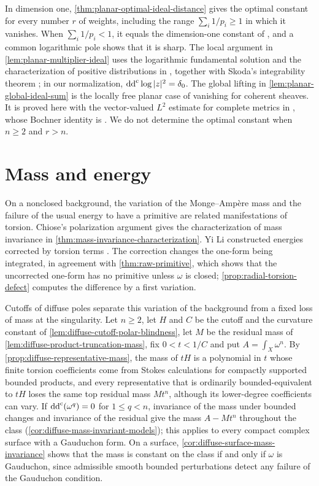 In dimension one, \cref{thm:planar-optimal-ideal-distance} gives the optimal constant for every number $r$ of weights, including the range $\sum_i1/p_i\geq1$ in which it vanishes. When $\sum_i1/p_i<1$, it equals the dimension-one constant of \cite[v1, Theorem~1.2, pp.~1--2]{TakDivision26}, and a common logarithmic pole shows that it is sharp. The local argument in \cref{lem:planar-multiplier-ideal} uses the logarithmic fundamental solution and the characterization of positive distributions in \cite[Chapter~I, Sections~4.A--4.C, pp.~30--36]{DemCADG}, together with Skoda's integrability theorem \cite[Lemma~5.6]{DemAM11}; in our normalization, $\mathrm{dd}^{\mathrm{c}}\log|z|^2=\delta_0$. The global lifting in \cref{lem:planar-global-ideal-sum} is the locally free planar case of vanishing for coherent sheaves. It is proved here with the vector-valued $L^2$ estimate for complete metrics in \cite[Theorem~5.1 and its proof, pp.~33--34]{DemAM11}, whose Bochner identity is \cite[Section~4.C, p.~30]{DemAM11}. We do not determine the optimal constant when $n\geq2$ and $r>n$.

\section{Mass and energy}
\label{sec:history-mass-energy}

On a nonclosed background, the variation of the Monge--Amp\`ere mass and the failure of the usual energy to have a primitive are related manifestations of torsion. Chiose's polarization argument \cite[Theorems~1--2, pp.~576--577]{Chiose16} gives the characterization of mass invariance in \cref{thm:mass-invariance-characterization}. Yi Li constructed energies corrected by torsion terms \cite[v1, Equation~(1.18) and Theorem~1.2, p.~5]{YiLi10}. The correction changes the one-form being integrated, in agreement with \cref{thm:raw-primitive}, which shows that the uncorrected one-form has no primitive unless $\omega$ is closed; \cref{prop:radial-torsion-defect} computes the difference by a first variation.

Cutoffs of diffuse poles separate this variation of the background from a fixed loss of mass at the singularity. Let $n\geq2$, let $H$ and $C$ be the cutoff and the curvature constant of \cref{lem:diffuse-cutoff-polar-blindness}, let $M$ be the residual mass of \cref{lem:diffuse-product-truncation-mass}, fix $0<t<1/C$ and put $A=\int_X\omega^n$. By \cref{prop:diffuse-representative-mass}, the mass of $tH$ is a polynomial in $t$ whose finite torsion coefficients come from Stokes calculations for compactly supported bounded products, and every representative that is ordinarily bounded-equivalent to $tH$ loses the same top residual mass $Mt^n$, although its lower-degree coefficients can vary. If $\mathrm{dd}^{\mathrm{c}}(\omega^q)=0$ for $1\leq q<n$, invariance of the mass under bounded changes and invariance of the residual give the mass $A-Mt^n$ throughout the class (\cref{cor:diffuse-mass-invariant-models}); this applies to every compact complex surface with a Gauduchon form. On a surface, \cref{cor:diffuse-surface-mass-invariance} shows that the mass is constant on the class if and only if $\omega$ is Gauduchon, since admissible smooth bounded perturbations detect any failure of the Gauduchon condition.

